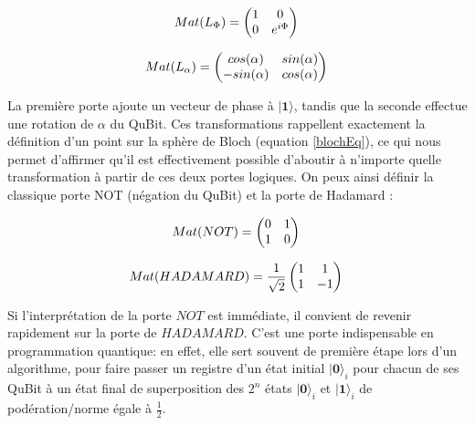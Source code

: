 \documentclass[a4paper,12pt]{report}
\newcommand{\quSt}[1]{\bm{|#1\rangle}}
\begin{document}
\begin{equation}
	 Mat(L_{\Phi}) = \left( \begin{matrix} 1 & 0 \\ 0 & e^{i\Phi} \end{matrix} \right ) \\
\end{equation}

\begin{equation}
	 Mat(L_{\alpha}) = \left( \begin{matrix} cos(\alpha) & sin(\alpha) \\ -sin(\alpha) & cos(\alpha) \end{matrix} \right ) \\
\end{equation}

\vspace{1\baselineskip}

\par{
	La première porte ajoute un vecteur de phase à $\quSt{1}$, tandis que la seconde effectue une rotation de $\alpha$ du QuBit. Ces transformations rappellent exactement la définition d'un point sur la sphère de Bloch (equation \ref{blochEq}), ce qui nous permet d'affirmer qu'il est effectivement possible d'aboutir à n'importe quelle transformation à partir de ces deux portes logiques. On peux ainsi définir la classique porte NOT (négation du QuBit) et la porte de Hadamard :
}

\begin{equation}
	 Mat(NOT) = \left( \begin{matrix} 0 & 1 \\ 1 & 0 \end{matrix} \right ) \\
\end{equation}

\begin{equation}
	 Mat(HADAMARD) = \frac{1}{\sqrt{2}} \left( \begin{matrix} 1 & 1 \\ 1 & -1 \end{matrix} \right ) \\
\end{equation}

\vspace{1\baselineskip}

\par{
	Si l'interprétation de la porte $NOT$ est immédiate, il convient de revenir rapidement sur la porte de $HADAMARD$. C'est une porte indispensable en programmation quantique: en effet, elle sert souvent de première étape lors d'un algorithme, pour faire passer un registre d'un état initial $\quSt{0}_i$ pour chacun de ses QuBit à un état final de superposition des $2^n$ états $\quSt{0}_i$ et $\quSt{1}_i$ de podération/norme égale à $\frac{1}{2}$.
}
\end{document}
